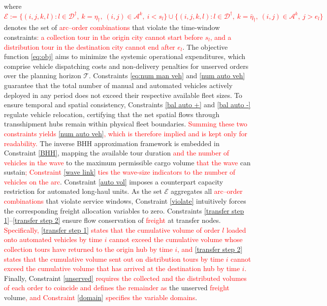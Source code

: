 \documentclass[10pt, reqno]{amsart}
\begin{document}
where \textcolor{red}{$\mathcal{E} := \{(i,j,k,l) : l \in \mathcal{D}^{\dagger},\ k=\eta_{\dagger},\ (i,j) \in \mathcal{A}^k,\ i < s_l\} \cup \{(i,j,k,l) : l \in \mathcal{D}^{\dagger},\ k=\bar{\eta}_{\dagger},\ (i,j) \in \mathcal{A}^k,\ j > e_l\}$} denotes the set of \textcolor{red}{arc--order combinations} that violate the time-window constraints\textcolor{red}{: a collection tour in the origin city cannot start before $s_l$, and a distribution tour in the destination city cannot end after $e_l$}. The objective function \eqref{eq:obj} aims to minimize the systemic operational expenditures, which comprise vehicle dispatching costs and non-delivery penalties for unserved orders over the planning horizon $\mathcal{T}$. Constraints \eqref{eq:num man veh} and \eqref{num auto veh} guarantee that the total number of manual and automated vehicles actively deployed in any period does not exceed their respective available fleet sizes. To ensure temporal and spatial consistency, Constraints \eqref{bal auto +} and \eqref{bal auto -} regulate vehicle relocation, certifying that the net spatial flows through transshipment hubs remain within physical fleet boundaries. \textcolor{red}{Summing these two constraints yields \eqref{num auto veh}, which is therefore implied and is kept only for readability.} The inverse BHH approximation framework is embedded in Constraint \eqref{BHH}, mapping the available tour duration \textcolor{red}{and the number of vehicles in the wave} to the maximum permissible cargo volume \textcolor{red}{that the wave} can sustain\textcolor{red}{; Constraint \eqref{wave link} ties the wave-size indicators to the number of vehicles on the arc}. Constraint \eqref{auto vol} imposes a counterpart capacity restriction for automated long-haul units. As the set $\mathcal{E}$ aggregates all \textcolor{red}{arc--order combinations} that violate service windows, Constraint \eqref{violate} intuitively forces the corresponding freight allocation variables to zero. Constraints \eqref{transfer step 1}–\eqref{transfer step 2} ensure flow conservation of \textcolor{red}{freight} at transfer nodes. \textcolor{red}{Specifically, \eqref{transfer step 1} states that the cumulative volume of order $l$ loaded onto automated vehicles by time $i$ cannot exceed the cumulative volume whose collection tours have returned to the origin hub by time $i$, and \eqref{transfer step 2} states that the cumulative volume sent out on distribution tours by time $i$ cannot exceed the cumulative volume that has arrived at the destination hub by time $i$.} Finally, Constraint \eqref{unserved} \textcolor{red}{requires the collected and the distributed volumes of each order to coincide and defines the remainder as} the unserved \textcolor{red}{freight} volume\textcolor{red}{, and Constraint \eqref{domain} specifies the variable domains}.
\end{document}
